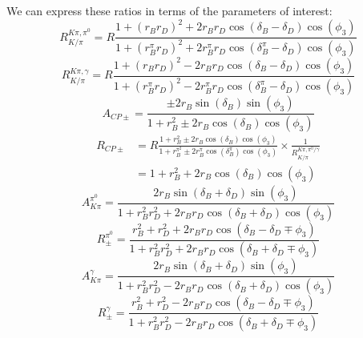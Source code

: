 \documentclass[oneside,12pt]{article}
\begin{document}
We can express these ratios in terms of the parameters of interest:
  \begin{equation}
    R^{K\pi,
    \pi^0}_{K/\pi}=R\frac{1+(r_Br_D)^2+2r_Br_D\cos(\delta_B-\delta_D)\cos(\phi_3)}{1+(r_B^{\pi}r_D)^2+2r_B^{\pi}r_D\cos(\delta_B^{\pi}-\delta_D)\cos(\phi_3)}
    \label{eq:Rkpipi0}
  \end{equation}
  \begin{equation}
    R^{K\pi,
    \gamma}_{K/\pi}=R\frac{1+(r_Br_D)^2-2r_Br_D\cos(\delta_B-\delta_D)\cos(\phi_3)}{1+(r_B^{\pi}r_D)^2-2r_B^{\pi}r_D\cos(\delta_B^{\pi}-\delta_D)\cos(\phi_3)}
    \label{eq:Rkpigamma}
  \end{equation}
  \begin{equation}
    A_{CP\pm}=\frac{\pm 2r_{B}\sin(\delta_{B})\sin(\phi_{3})}{1+r_{B}^{2}\pm 2r_{B}\cos(\delta_{B})\cos(\phi_{3})}
    \label{eq:ACP}
  \end{equation}
  \begin{align}
    R_{CP\pm} &=R\frac{1 + r_{B}^{2} \pm 2r_{B}\cos(\delta_{B})\cos(\phi_{3})}{1 +
    r_{B}^{\pi^2} \pm 2r_{B}^{\pi}\cos(\delta_{B}^{\pi})\cos(\phi_{3})} \times
    \frac{1}{R^{K\pi,\pi^0 /\gamma}_{K/\pi}} \nonumber \\
    &= 1 + r_B^2 + 2r_B\cos(\delta_B)\cos(\phi_3) 
    \label{eq:RCP}
  \end{align}
  \begin{equation}
    A_{K\pi}^{\pi^{0}}=\frac{2r_{B}\sin(\delta_{B}+\delta_{D})\sin(\phi_{3})}{1+r_{B}^{2}r_{D}^{2}+2r_{B}r_{D}\cos(\delta_{B}+\delta_{D})\cos(\phi_{3})}
    \label{eq:AfavPi0}
  \end{equation}
  \begin{equation}
    R_{\pm}^{\pi^{0}}=\frac{r_{B}^{2} + r_{D}^{2} +
    2r_{B}r_{D}\cos(\delta_{B}-\delta_{D}\mp
    \phi_{3})}{1+r_{B}^{2}r_{D}^{2}+2r_{B}r_{D}\cos(\delta_{B}+\delta_{D}\mp
    \phi_{3})} \label{eq:RPlusMinusPi0}
  \end{equation}
  \begin{equation}
    A_{K\pi}^{\gamma}=\frac{2r_{B}\sin(\delta_{B}+\delta_{D})\sin(\phi_{3})}{1+r_{B}^{2}r_{D}^{2}-2r_{B}r_{D}\cos(\delta_{B}+\delta_{D})\cos(\phi_{3})}
    \label{eq:AfavGamma}
  \end{equation}
  \begin{equation}
    R_{\pm}^{\gamma}=\frac{r_{B}^{2} + r_{D}^{2} -
    2r_{B}r_{D}\cos(\delta_{B}-\delta_{D}\mp
    \phi_{3})}{1+r_{B}^{2}r_{D}^{2}-2r_{B}r_{D}\cos(\delta_{B}+\delta_{D}\mp
    \phi_{3})} \label{eq:RPlusMinusGamma}
  \end{equation}
\end{document}
